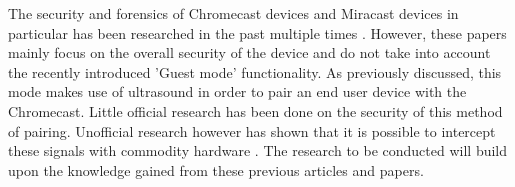 The security and forensics of Chromecast devices and Miracast devices in particular has been researched in the past multiple times \cite{tekeoglu2014blackbox} \cite{tekeoglu2015closer} \cite{forensics2014chromecast}. However, these papers mainly focus on the overall security of the device and do not take into account the recently introduced 'Guest mode' functionality. As previously discussed, this mode makes use of ultrasound in order to pair an end user device with the Chromecast. Little official research has been done on the security of this method of pairing. Unofficial research however has shown that it is possible to intercept these signals with commodity hardware \cite{chris'anfractuosus'2014} \cite{borissmus2013}. The research to be conducted will build upon the knowledge gained from these previous articles and papers.
